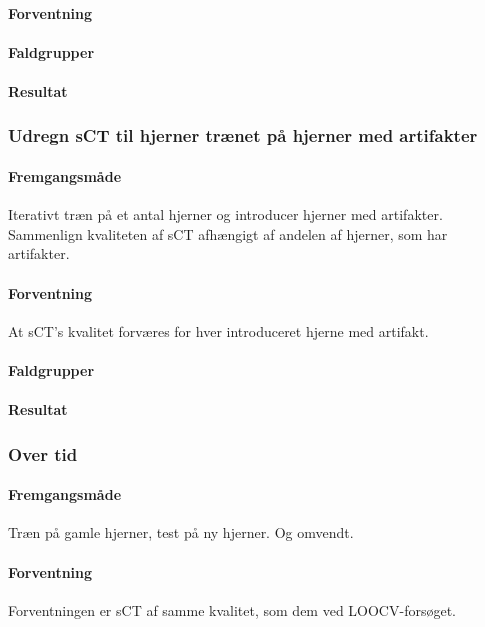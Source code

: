 \paragraph   {Forventning}

\paragraph   {Faldgrupper}

\paragraph   {Resultat}

\subsubsection{Udregn sCT til hjerner trænet på hjerner med artifakter}
\paragraph   {Fremgangsmåde}
Iterativt træn på et antal hjerner og introducer hjerner med artifakter.
Sammenlign kvaliteten af sCT afhængigt af andelen af hjerner, som har
artifakter.

\paragraph   {Forventning}
At sCT's kvalitet forværes for hver introduceret hjerne med artifakt.

\paragraph   {Faldgrupper}

\paragraph   {Resultat}


\subsubsection{Over tid}
\paragraph   {Fremgangsmåde}
Træn på gamle hjerner, test på ny hjerner. Og omvendt.

\paragraph   {Forventning}
Forventningen er sCT af samme kvalitet, som dem ved LOOCV-forsøget.

